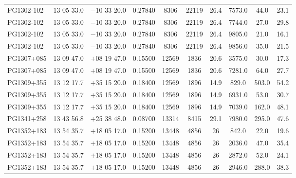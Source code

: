 \begin{landscape}
\begin{center}
\begin{longtable}{l c c c c c c c c c}
PG1302-102  &              13 05 33.0  &         $-$10 33 20.0  &       0.27840  & 8306  &    22119  &      26.4  &      7573.0  &  44.0  &   23.1  \\
PG1302-102  &              13 05 33.0  &         $-$10 33 20.0  &       0.27840  & 8306  &    22119  &      26.4  &      7744.0  &  27.0  &   29.8  \\
PG1302-102  &              13 05 33.0  &         $-$10 33 20.0  &       0.27840  & 8306  &    22119  &      26.4  &      9805.0  &  21.0  &   16.1  \\
PG1302-102  &              13 05 33.0  &         $-$10 33 20.0  &       0.27840  & 8306  &    22119  &      26.4  &      9856.0  &  35.0  &   21.5  \\
PG1307+085  &              13 09 47.0  &         $+$08 19 47.0  &       0.15500  & 12569  &   1836  &       20.6  &      3575.0  &  30.0  &   17.3  \\
PG1307+085  &              13 09 47.0  &         $+$08 19 47.0  &       0.15500  & 12569  &   1836  &       20.6  &      7281.0  &  64.0  &   27.7  \\
PG1309+355  &              13 12 17.7  &         $+$35 15 20.0  &       0.18400  & 12569  &   1896  &       14.9  &      829.0  &   503.0  &  54.2  \\
PG1309+355  &              13 12 17.7  &         $+$35 15 20.0  &       0.18400  & 12569  &   1896  &       14.9  &      6931.0  &  53.0  &   30.7  \\
PG1309+355  &              13 12 17.7  &         $+$35 15 20.0  &       0.18400  & 12569  &   1896  &       14.9  &      7039.0  &  162.0  &  48.1  \\
PG1341+258  &              13 43 56.8  &         $+$25 38 48.0  &       0.08700  & 13314  &   8415  &       29.1  &      7980.0  &  295.0  &  47.6  \\
PG1352+183  &              13 54 35.7  &         $+$18 05 17.0  &       0.15200  & 13448  &   4856  &       26  &        842.0  &   22.0  &   19.6  \\
PG1352+183  &              13 54 35.7  &         $+$18 05 17.0  &       0.15200  & 13448  &   4856  &       26  &        2036.0  &  47.0  &   35.4  \\
PG1352+183  &              13 54 35.7  &         $+$18 05 17.0  &       0.15200  & 13448  &   4856  &       26  &        2872.0  &  52.0  &   24.1  \\
PG1352+183  &              13 54 35.7  &         $+$18 05 17.0  &       0.15200  & 13448  &   4856  &       26  &        2946.0  &  288.0  &  38.3  \\

\end{longtable}
\end{center}
\end{landscape}
